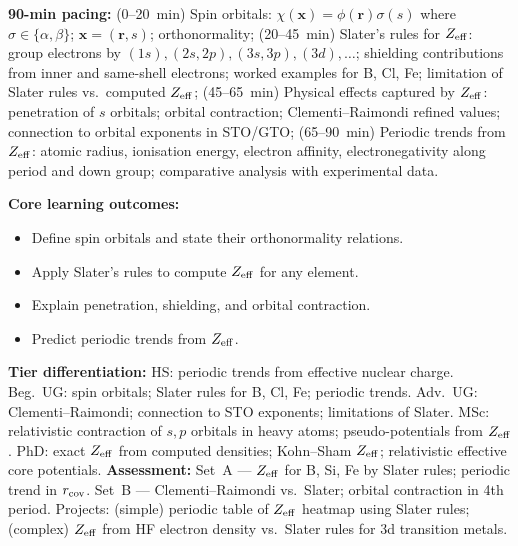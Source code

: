 \documentclass[11pt,a4paper]{article}
\begin{document}
\medskip

\begin{tcolorbox}[chembox, title={Module~III.2 --- Lecture L04: Spin Orbitals, Slater Screening, and Effective Nuclear Charge}]
\textbf{90-min pacing:} (0--20~min) Spin orbitals: $\chi(\mathbf{x})=\phi(\mathbf{r})\sigma(s)$ where $\sigma\in\{\alpha,\beta\}$; $\mathbf{x}=(\mathbf{r},s)$; orthonormality; (20--45~min) Slater's rules for $Z_{\rm eff}$: group electrons by $(1s), (2s,2p), (3s,3p), (3d), \ldots$; shielding contributions from inner and same-shell electrons; worked examples for B, Cl, Fe; limitation of Slater rules vs.\ computed $Z_{\rm eff}$; (45--65~min) Physical effects captured by $Z_{\rm eff}$: penetration of $s$ orbitals; orbital contraction; Clementi--Raimondi refined values; connection to orbital exponents in STO/GTO; (65--90~min) Periodic trends from $Z_{\rm eff}$: atomic radius, ionisation energy, electron affinity, electronegativity along period and down group; comparative analysis with experimental data.

\medskip\textbf{Core learning outcomes:}
\begin{itemize}[leftmargin=1.4em,topsep=2pt,itemsep=1pt]
  \item Define spin orbitals and state their orthonormality relations.
  \item Apply Slater's rules to compute $Z_{\rm eff}$ for any element.
  \item Explain penetration, shielding, and orbital contraction.
  \item Predict periodic trends from $Z_{\rm eff}$.
\end{itemize}
\medskip\textbf{Tier differentiation:}
HS: periodic trends from effective nuclear charge.
Beg.\ UG: spin orbitals; Slater rules for B, Cl, Fe; periodic trends.
Adv.\ UG: Clementi--Raimondi; connection to STO exponents; limitations of Slater.
MSc: relativistic contraction of $s,p$ orbitals in heavy atoms; pseudo-potentials from $Z_{\rm eff}$.
PhD: exact $Z_{\rm eff}$ from computed densities; Kohn--Sham $Z_{\rm eff}$; relativistic effective core potentials.
\medskip\textbf{Assessment:}
Set~A --- $Z_{\rm eff}$ for B, Si, Fe by Slater rules; periodic trend in $r_{\rm cov}$.
Set~B --- Clementi--Raimondi vs.\ Slater; orbital contraction in 4th period.
Projects: (simple) periodic table of $Z_{\rm eff}$ heatmap using Slater rules; (complex) $Z_{\rm eff}$ from HF electron density vs.\ Slater rules for 3d transition metals.
\end{tcolorbox}
\end{document}
